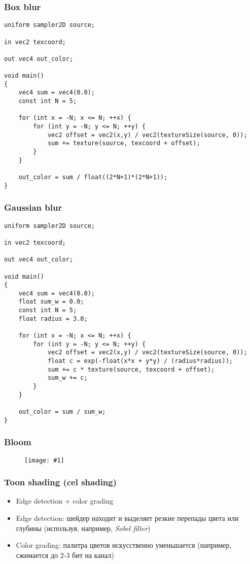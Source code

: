 \documentclass[10pt]{beamer}
\newcommand{\slideimage}[1]{
  \begin{figure}
    \begin{adjustbox}{width=\textwidth, totalheight=\textheight-2\baselineskip-2\baselineskip,keepaspectratio}
      \texttt{[image: \#1]}
    \end{adjustbox}
  \end{figure}
}
\begin{document}
\begin{frame}[fragile]
\frametitle{Box blur}
\begin{verbatim}
uniform sampler2D source;

in vec2 texcoord;

out vec4 out_color;

void main()
{
    vec4 sum = vec4(0.0);
    const int N = 5;

    for (int x = -N; x <= N; ++x) {
        for (int y = -N; y <= N; ++y) {
            vec2 offset = vec2(x,y) / vec2(textureSize(source, 0));
            sum += texture(source, texcoord + offset);
        }
    }

    out_color = sum / float((2*N+1)*(2*N+1));
}
\end{verbatim}
\end{frame}

\begin{frame}[fragile]
\frametitle{Gaussian blur}
\begin{verbatim}
uniform sampler2D source;

in vec2 texcoord;

out vec4 out_color;

void main()
{
    vec4 sum = vec4(0.0);
    float sum_w = 0.0;
    const int N = 5;
    float radius = 3.0;

    for (int x = -N; x <= N; ++x) {
        for (int y = -N; y <= N; ++y) {
            vec2 offset = vec2(x,y) / vec2(textureSize(source, 0));
            float c = exp(-float(x*x + y*y) / (radius*radius));
            sum += c * texture(source, texcoord + offset);
            sum_w += c;
        }
    }

    out_color = sum / sum_w;
}
\end{verbatim}
\end{frame}

\begin{frame}[fragile]
\frametitle{Bloom}
\slideimage{bloom-diagram.png}
\end{frame}

\begin{frame}[fragile]
\frametitle{Toon shading (cel shading)}
\begin{itemize}
\item Edge detection + color grading
\pause
\item Edge detection: шейдер находит и выделяет резкие перепады цвета или глубины (используя, например, \textit{Sobel filter})
\pause
\item Color grading: палитра цветов искусственно уменьшается (например, сжимается до 2-3 бит на канал)
\end{itemize}
\end{frame}
\end{document}
